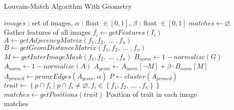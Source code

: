 \documentclass{article}
\begin{document}
\begin{algorithm}
\caption{Louvain-Match Algorithm With Geometry}
\label{alg-geometry}
\begin{algorithmic}
\Require $images$ : set of images, $\alpha$ : float $\in \left[0, 
1\right]$, $\beta$ : float $\in \left[0, 1\right]$
\State $matches\gets \varnothing$
 \Comment Gather features of all images
	\State $f_i\gets getFeatures(I_i)$
\EndFor
\State $A\gets getAdjecencyMatrix(f_1, f_2,\; \ldots \;, f_n)$
\State $B\gets getGeomDistanceMatrix(f_1, f_2,\; \ldots \;, f_n)$
\State $M\gets getInterImageMask(f_1, f_2,\; \ldots \;, f_n)$
\State $B_{norm}\gets 1 - normalize(G)$ \State $A_{norm}\gets 1 - 
normalize(A)$
\State $A_{geom}\gets A_{norm}\left[ \neg M\right] + \beta \cdot 
B_{norm}\left[M\right]$
\State $A_{pruned}\gets pruneEdges(A_{geom},\alpha)$
\State $P\gets cluster(A_{pruned})$ 
	\State $trait\gets \left\{p \cap f_i \mid p \cap f_i \neq 
\varnothing, f_i \in \left\{f_1, f_2,\; \ldots \;, f_n\right\}\right\}$
		\State $matches\gets getPositions(trait)$
		\Comment Position of trait in each image
	\EndIf
\EndFor \\
\Return matches
\end{algorithmic}
\end{algorithm}
\end{document}
